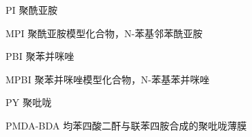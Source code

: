 
\begin{denotation}[3cm]
  \item[PI] 聚酰亚胺
  \item[MPI] 聚酰亚胺模型化合物，N-苯基邻苯酰亚胺
  \item[PBI] 聚苯并咪唑
  \item[MPBI] 聚苯并咪唑模型化合物，N-苯基苯并咪唑
  \item[PY] 聚吡咙
  \item[PMDA-BDA] 均苯四酸二酐与联苯四胺合成的聚吡咙薄膜

\end{denotation}






